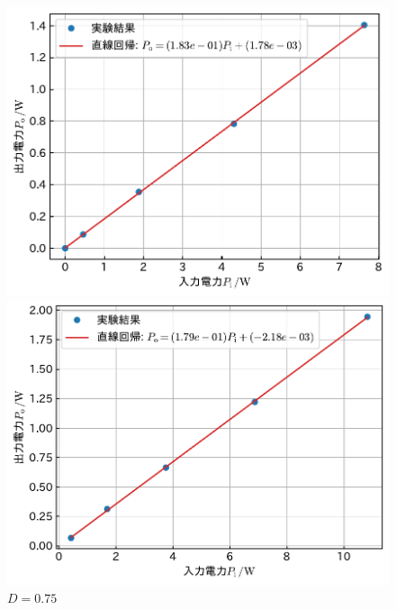 \documentclass[1_power_supply.tex]{subfiles}
\begin{document}
\begin{figure}[htbp]
		\vspace{1.5mm}
		\begin{minipage}{0.45\columnwidth}
			\centering
			\includegraphics[width=0.8\columnwidth]{2_60p.pdf}
			\caption{$D=0.6$}\label{fig:2_60p}
		\end{minipage}
		\begin{minipage}{0.45\columnwidth}
			\centering
			\includegraphics[width=0.8\columnwidth]{2_75p.pdf}
			\caption{$D=0.75$}\label{fig:2_75p}
		\end{minipage}


\end{figure}
\end{document}
